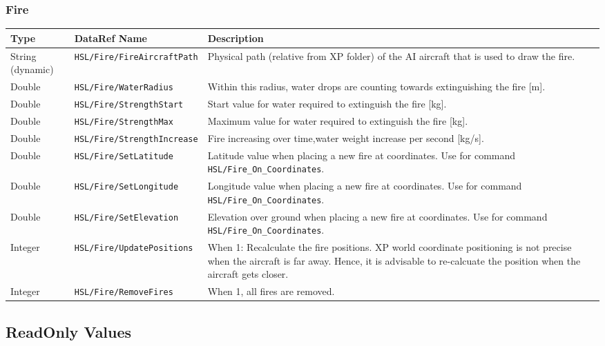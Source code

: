 \documentclass[10pt,a4]{scrartcl}
\begin{document}
\subsubsection{Fire}
\begin{tabularx}{\linewidth}{| l | l | X |} \hline
\textbf{Type} & \textbf{DataRef Name}& \textbf{Description}\\ \hline
String (dynamic) & \texttt{HSL/Fire/FireAircraftPath} & Physical path (relative from XP folder) of the AI aircraft that is used to draw the fire.\\ \hline
Double & \texttt{HSL/Fire/WaterRadius} & Within this radius, water drops are counting towards extinguishing the fire [m].\\ \hline

Double & \texttt{HSL/Fire/StrengthStart} & Start value for water required to extinguish the fire [kg].\\ \hline
Double & \texttt{HSL/Fire/StrengthMax} & Maximum value for water required to extinguish the fire [kg].\\ \hline
Double & \texttt{HSL/Fire/StrengthIncrease} & Fire increasing over time,water weight increase per second [kg/s].\\ \hline


Double & \texttt{HSL/Fire/SetLatitude} & Latitude value when placing a new fire at coordinates. Use for command \texttt{HSL/Fire\_On\_Coordinates}.\\ \hline
Double & \texttt{HSL/Fire/SetLongitude} & Longitude value when placing a new fire at coordinates. Use for command \texttt{HSL/Fire\_On\_Coordinates}.\\ \hline
Double & \texttt{HSL/Fire/SetElevation} & Elevation over ground when placing a new fire at coordinates. Use for command \texttt{HSL/Fire\_On\_Coordinates}.\\ \hline

Integer & \texttt{HSL/Fire/UpdatePositions} & When 1: Recalculate the fire positions. XP world coordinate positioning is not precise when the aircraft is far away. Hence, it is advisable to re-calcuate the position when the aircraft gets closer.\\ \hline

Integer & \texttt{HSL/Fire/RemoveFires} & When 1, all fires are removed.\\ \hline
\end{tabularx}

\subsection{ReadOnly Values}
\end{document}
